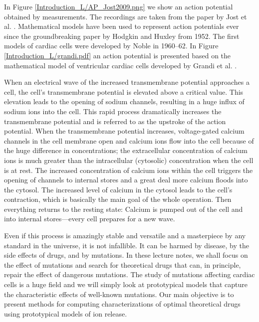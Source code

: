 In Figure \ref{Introduction_L/AP_Jost2009.png}  we show an action potential obtained by measurements. The recordings are taken from the paper by Jost et al. \cite{Jost2009}. Mathematical models have been used to represent action potentials ever since the groundbreaking paper by Hodgkin and Huxley \cite{Hodgkin1952} from 1952. The first models of cardiac cells were developed by Noble \cite{Noble1960,Noble1962} in 1960--62. In Figure \ref{Introduction_L/grandi.pdf} an action potential is presented based on the mathematical model of ventricular cardiac cells developed by Grandi et al. \cite{Grandi2010B}.



When an electrical wave of the increased transmembrane potential approaches a cell, the cell's transmembrane potential is elevated above a critical value. This elevation leads to the opening of sodium channels, resulting in a huge influx of sodium ions into the cell. This rapid process dramatically increases the transmembrane potential and is referred to as the upstroke of the action potential.
When the transmembrane potential increases, voltage-gated calcium channels in the cell membrane open and calcium ions flow into the cell because of the huge difference in concentrations; the extracellular concentration of calcium ions is much greater than the intracellular (cytosolic) concentration when the cell is at rest. The increased concentration of calcium ions within the cell triggers the opening of channels to internal stores and a great deal more calcium floods into the cytosol.  The increased level of calcium in the cytosol leads to the cell's contraction, which is basically the main goal of the whole operation. Then everything returns to the resting state: Calcium is pumped out of the cell and into internal stores---every cell prepares for a new wave. 

Even if this process is amazingly stable and versatile and a masterpiece by any standard in the universe, it is not infallible. It can be harmed by disease, by  the side effects of drugs, and by mutations. In these lecture notes, we shall focus on the effect of mutations and search for theoretical drugs that can, in principle, repair the effect of dangerous mutations. The study of mutations affecting cardiac cells is a huge field and we will simply look at prototypical models that capture the characteristic effects of well-known mutations. Our main objective is to present methods for computing characterizations of optimal theoretical drugs using prototypical models of ion release. 

